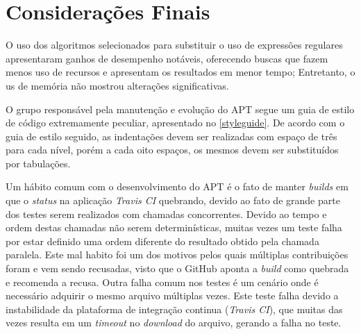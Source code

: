 \chapter{Considerações Finais} %
\label{cha:dificuldades_encontradas}


O uso dos algoritmos selecionados  para substituir o uso de expressões regulares apresentaram ganhos de desempenho notáveis, oferecendo buscas que fazem menos uso de recursos e apresentam os resultados em menor tempo; Entretanto, o us de memória não mostrou  alterações significativas.


O grupo responsável pela manutenção e evolução do {\code APT} segue um guia de estilo de código extremamente peculiar, apresentado no \autoref{styleguide}. De acordo com o guia de estilo seguido, as indentações devem ser realizadas com espaço de três para cada nível, porém a cada oito espaços, os mesmos devem ser substituídos por tabulações.


Um hábito comum com o desenvolvimento do {\code APT} é o fato de manter \textit{builds} em que o \textit{status} na aplicação \textit{Travis CI} quebrando, devido ao fato de grande parte dos testes serem realizados com chamadas concorrentes. Devido ao tempo e ordem destas chamadas não serem determinísticas, muitas vezes um teste falha por estar definido uma ordem diferente do resultado obtido pela chamada paralela.
Este mal habito foi um dos motivos pelos quais múltiplas contribuições foram e vem sendo recusadas, visto que o GitHub aponta a \textit{build} como quebrada e recomenda a recusa. Outra falha comum nos testes é um cenário onde é necessário adquirir o mesmo arquivo múltiplas vezes. Este teste falha devido a instabilidade da plataforma de integração continua (\textit{Travis CI}), que muitas das vezes resulta em um \textit{timeout} no \textit{download} do arquivo, gerando a falha no teste.



